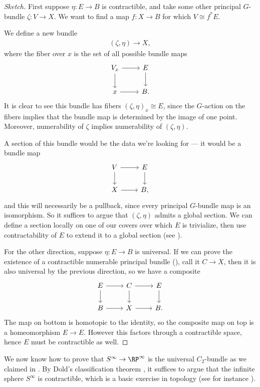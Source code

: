 \documentclass[11pt]{amsart}
\begin{document}
\begin{proof}[Sketch]
First suppose $\eta \colon E \to B$ is contractible, and take some other principal $G$-bundle $\zeta \colon V \to X$. We want to find a map $f \colon X \to B$ for which $V\cong f^\ast E$.

We define a new bundle
\begin{align*}
    ( \zeta,\eta ) \to X,
\end{align*}
where the fiber over $x$ is the set of all possible bundle maps
\[ \begin{tikzcd}
    V_x\rar\dar & E\dar\\
    x\rar & B.
\end{tikzcd} \]
It is clear to see this bundle has fibers $(\zeta,\eta)_x \cong E$, since the $G$-action on the fibers implies that the bundle map is determined by the image of one point. Moreover, numerability of $\zeta$ implies numerability of $(\zeta,\eta)$.

A section of this bundle would be the data we're looking for --- it would be a bundle map
\[ \begin{tikzcd}
    V\rar\dar & E\dar\\
    X\rar & B,
\end{tikzcd} \]
and this will necessarily be a pullback, since every principal $G$-bundle map is an isomorphism. So it suffices to argue that $(\zeta,\eta)$ admits a global section. We can define a section locally on one of our covers over which $E$ is trivialize, then use contractability of $E$ to extend it to a global section (see \cite[2.6,2.7,2.8]{doldPartitionsUnityTheory1963}).

For the other direction, suppose $\eta \colon E \to B$ is universal. If we can prove the existence of a contractible numerable principal bundle (\cite[\S8]{doldPartitionsUnityTheory1963}), call it $C \to X$, then it is also universal by the previous direction, so we have a composite
\[ \begin{tikzcd}
    E\rar\dar & C\rar\dar & E\dar \\
    B\rar & X\rar & B.
\end{tikzcd} \]
The map on bottom is homotopic to the identity, so the composite map on top is a homeomorphism $E \to E$. However this factors through a contractible space, hence $E$ must be contractible as well.
\end{proof}

\begin{remark}
We now know how to prove that $S^\infty \to \RP^\infty$ is the universal $C_2$-bundle as we claimed in . By Dold's classification theorem , it suffices to argue that the infinite sphere $S^\infty$ is contractible, which is a basic exercise in topology (see for instance \cite[p.~19]{Hatcher}).
\end{remark}
\end{document}
